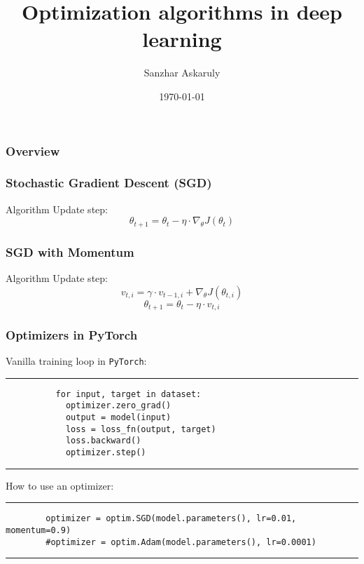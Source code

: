 \documentclass{beamer}
\title[CodeSeoul] %
	{Optimization algorithms in deep learning}
\author[AI Research Paper Review] %
	{Sanzhar Askaruly}
\institute[] %
	{ Ulsan National Institute of Science and Technology\newline
	  Ph.D. Candidate in Biomedical Engineering}
\date{\today}
\begin{document}

    \begin{frame}
    \frametitle{Overview} %
    \tableofcontents 
    \end{frame}

    \begin{frame}
      \frametitle{Stochastic Gradient Descent (SGD)} %
      \begin{block}{Algorithm}
        Update step:
        \begin{equation}
          \theta_{t+1} = \theta_{t} - \eta \cdot \nabla_{\theta}J(\theta_t)
        \end{equation}
      \end{block}
    \end{frame}

    \begin{frame}
      \frametitle{SGD with Momentum} %
      \begin{block}{Algorithm}
        Update step:
        \begin{equation}    %
          v_{t,i} = \gamma \cdot v_{t-1,i} + \nabla_{\theta}J(\theta_{t,i})
        \end{equation}
        \begin{equation}    %
          \theta_{t+1} = \theta_{t} - \eta \cdot v_{t,i}
        \end{equation}
      \end{block}
    \end{frame}

    \begin{frame}[fragile]
      \frametitle{Optimizers in PyTorch}

      Vanilla training loop in \verb|PyTorch|:
      \rule{\textwidth}{1pt}
      \scriptsize
      \begin{verbatim}
          for input, target in dataset:
            optimizer.zero_grad()
            output = model(input)
            loss = loss_fn(output, target)
            loss.backward()
            optimizer.step()
      \end{verbatim}
      \rule{\textwidth}{1pt}
      
      \normalsize
      \vspace{1cm}
      How to use an optimizer:
      \rule{\textwidth}{1pt}
      \scriptsize
      \begin{verbatim}
        optimizer = optim.SGD(model.parameters(), lr=0.01, momentum=0.9)
        #optimizer = optim.Adam(model.parameters(), lr=0.0001)
      \end{verbatim}
      \rule{\textwidth}{1pt}
      

    \end{frame}
\end{document}

